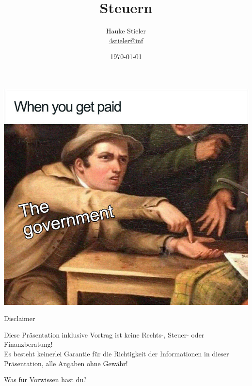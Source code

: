 \documentclass[draft]{beamer}
\author[Hauke Stieler]{Hauke Stieler\\\href{mailto:4stieler@informatik.uni-hamburg.de}{4stieler@inf}}
\title{Steuern}
\date{\today}
\newcommand{\n}{\hfill\\\vspace{0.25cm}}
\begin{document}
	{
		\begin{frame}
			\includegraphics[width=\paperwidth,trim=2cm 2cm -1.9cm 3.35cm]{images/tax-government}
		\end{frame}
		\addtocounter{page}{-1}
	}

	{
		\maketitle
		\addtocounter{page}{-1}
	}
	
	\begin{frame}{Disclaimer}
		\begin{center}
			Diese Präsentation inklusive Vortrag ist keine Rechts-, Steuer- oder Finanzberatung!\n
			Es besteht keinerlei Garantie für die Richtigkeit der Informationen in dieser Präsentation, alle Angaben ohne Gewähr!\n
		\end{center}
	\end{frame}

	\begin{frame}
		\begin{center}
			Was für Vorwissen hast du?
		\end{center}
	\end{frame}
\end{document}
